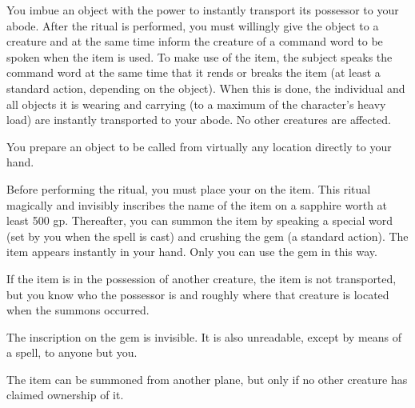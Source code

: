 \spellschool{Conjuration/Transmutation (Imbuement, Translocation) [Teleportation}
\begin{spelleffect}
You imbue an object with the power to instantly transport its possessor to your abode. After the ritual is performed, you must willingly give the object to a creature and at the same time inform the creature of a command word to be spoken when the item is used. To make use of the item, the subject speaks the command word at the same time that it rends or breaks the item (at least a standard action, depending on the object). When this is done, the individual and all objects it is wearing and carrying (to a maximum of the character's heavy load) are instantly transported to your abode. No other creatures are affected.
\end{spelleffect}

\begin{spelleffect}
You prepare an object to be called from virtually any location directly to your hand.
\par Before performing the ritual, you must place your  on the item. This ritual magically and invisibly inscribes the name of the item on a sapphire worth at least 500 gp. Thereafter, you can summon the item by speaking a special word (set by you when the spell is cast) and crushing the gem (a standard action). The item appears instantly in your hand. Only you can use the gem in this way.
\par If the item is in the possession of another creature, the item is not transported, but you know who the possessor is and roughly where that creature is located when the summons occurred.
\par The inscription on the gem is invisible. It is also unreadable, except by means of a  spell, to anyone but you.
\par The item can be summoned from another plane, but only if no other creature has claimed ownership of it.
\end{spelleffect}


